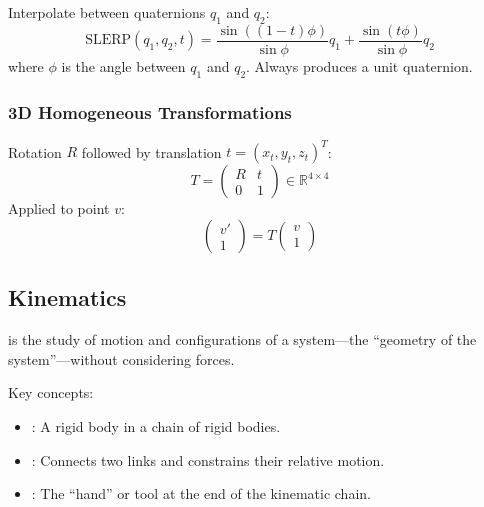 \begin{defbox}
Interpolate between quaternions $q_1$ and $q_2$:
\[
\text{SLERP}(q_1, q_2, t) = \frac{\sin((1-t)\phi)}{\sin\phi} q_1 + \frac{\sin(t\phi)}{\sin\phi} q_2
\]
where $\phi$ is the angle between $q_1$ and $q_2$. Always produces a unit quaternion.
\end{defbox}

\separator

\subsubsection{3D Homogeneous Transformations}

\begin{defbox}
Rotation $R$ followed by translation $t = (x_t, y_t, z_t)^T$:
\[
T = \begin{pmatrix} R & t \\ 0 & 1 \end{pmatrix} \in \mathbb{R}^{4\times 4}
\]
Applied to point $v$:
\[
\begin{pmatrix} v' \\ 1 \end{pmatrix} = T \begin{pmatrix} v \\ 1 \end{pmatrix}
\]
\end{defbox}

\bigseparator

\subsection{Kinematics}

\begin{defbox}[Kinematics]
 is the study of motion and configurations of a system---the ``geometry of the system''---without considering forces.

Key concepts:
\begin{itemize}
  \item {}: A rigid body in a chain of rigid bodies.
  \item {}: Connects two links and constrains their relative motion.
  \item {}: The ``hand'' or tool at the end of the kinematic chain.
\end{itemize}
\end{defbox}


